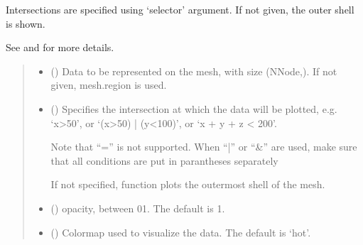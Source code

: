\documentclass[letterpaper,10pt,english]{sphinxmanual}
\begin{document}
\begin{fulllineitems}
\begin{fulllineitems}
\sphinxAtStartPar
Intersections are specified using ‘selector’ argument. If not given, the outer shell is shown.

\sphinxAtStartPar
See {\hyperref[\detokenize{_autosummary/nirfasterff.visualize.plotimage:nirfasterff.visualize.plotimage}]{}} and {\hyperref[\detokenize{_autosummary/nirfasterff.visualize.plot3dmesh_v2:nirfasterff.visualize.plot3dmesh_v2}]{}} for more details.
\begin{quote}\begin{description}
\begin{itemize}
\item {} 
\sphinxAtStartPar
{} (\sphinxstyleliteralemphasis{\sphinxupquote{, }}) \textendash{} Data to be represented on the mesh, with size (NNode,). If not given, mesh.region is used.

\item {} 
\sphinxAtStartPar
{} (\sphinxstyleliteralemphasis{\sphinxupquote{, }}) \textendash{} 
\sphinxAtStartPar
Specifies the intersection at which the data will be plotted, e.g. ‘x\textgreater{}50’, or ‘(x\textgreater{}50) | (y\textless{}100)’, or ‘x + y + z \textless{} 200’.

\sphinxAtStartPar
Note that “=” is not supported. When “|” or “\&” are used, make sure that all conditions are put in parantheses separately

\sphinxAtStartPar
If not specified, function plots the outermost shell of the mesh.


\item {} 
\sphinxAtStartPar
{} (\sphinxstyleliteralemphasis{\sphinxupquote{, }}) \textendash{} opacity, between 0\sphinxhyphen{}1. The default is 1.

\item {} 
\sphinxAtStartPar
{} (\sphinxstyleliteralemphasis{\sphinxupquote{, }}) \textendash{} Colormap used to visualize the data. The default is ‘hot’.


\end{itemize}
\end{description}
\end{quote}
\end{fulllineitems}
\end{fulllineitems}
\end{document}
